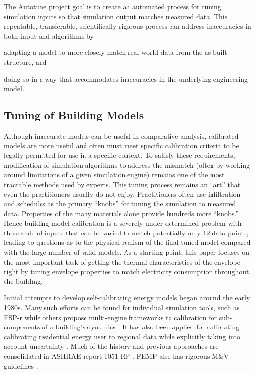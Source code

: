 \documentclass[preprint, review, 12pt]{elsarticle}
\begin{document}
The Autotune project \cite{cit:new2012} goal is to create an automated process for tuning simulation inputs so that simulation output matches measured data. This repeatable, transferable, scientifically rigorous process can address inaccuracies in both input and algorithms by 
\begin{inparaenum}[(1)]
\item adapting a model to more closely match real-world data from the as-built structure,  and 
\item doing so in a way that accommodates inaccuracies in the underlying engineering
model.
\end{inparaenum}

\subsection{Tuning of Building Models}
Although inaccurate models can be useful in comparative analysis, calibrated models are more useful and often must meet specific calibration criteria to be legally permitted for use in a specific context. To satisfy these requirements, modification of simulation algorithms to address the mismatch (often by working around limitations of a given simulation engine) remains one of the most tractable methods used by experts. This tuning process remains an ``art'' that even the practitioners usually do not enjoy. Practitioners often use infiltration and schedules as the primary ``knobs'' for tuning the simulation to measured data. Properties of the many materials alone provide hundreds more ``knobs.'' Hence building model calibration is a severely under-determined problem with thousands of inputs that can be varied to match potentially only 12 data points, leading to questions as to the physical realism of the final tuned model compared with the large number of valid models. As a starting point, this paper focuses on the most important task of getting the thermal characteristics of the envelope right by tuning envelope properties to match electricity consumption throughout the building.

Initial attempts to develop self-calibrating energy models began around the early 1980s. Many such efforts can be found for individual simulation tools, such as ESP-r \cite{Strachan2008601} while others propose multi-engine frameworks to calibration for sub-components of a building's dynamics \cite{Strachan2008601}. It has also been applied for calibrating calibrating residential energy user to regional data while explicitly taking into account uncertainty \cite{vanRuijven2010269}. Much of the history and previous approaches are consolidated in ASHRAE report 1051-RP \cite{cit:reddy2006}. FEMP also has rigorous M\&V guidelines \cite{cit:femp2008}.
\end{document}
